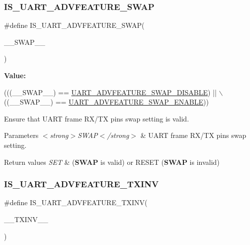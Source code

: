 \subsubsection{\texorpdfstring{I\+S\+\_\+\+U\+A\+R\+T\+\_\+\+A\+D\+V\+F\+E\+A\+T\+U\+R\+E\+\_\+\+S\+W\+AP}{IS\_UART\_ADVFEATURE\_SWAP}}
{\footnotesize\ttfamily \#define I\+S\+\_\+\+U\+A\+R\+T\+\_\+\+A\+D\+V\+F\+E\+A\+T\+U\+R\+E\+\_\+\+S\+W\+AP(\begin{DoxyParamCaption}\item[{}]{\+\_\+\+\_\+\+S\+W\+A\+P\+\_\+\+\_\+ }\end{DoxyParamCaption})}

{\bfseries Value\+:}
\begin{DoxyCode}
(((\_\_SWAP\_\_) == \hyperlink{group___u_a_r_t___rx___tx___swap_gad1217ff59732b36d4ee9b50e7ed81ec4}{UART\_ADVFEATURE\_SWAP\_DISABLE}) || \(\backslash\)
                                           ((\_\_SWAP\_\_) == 
      \hyperlink{group___u_a_r_t___rx___tx___swap_ga83138521e54eef41c75e9c37c2246eba}{UART\_ADVFEATURE\_SWAP\_ENABLE}))
\end{DoxyCode}


Ensure that U\+A\+RT frame R\+X/\+TX pins swap setting is valid. 


\begin{DoxyParams}{Parameters}
{\em $<$strong$>$\+S\+W\+A\+P$<$/strong$>$} & U\+A\+RT frame R\+X/\+TX pins swap setting. \\
\hline
\end{DoxyParams}

\begin{DoxyRetVals}{Return values}
{\em S\+ET} & ({\bfseries S\+W\+AP} is valid) or R\+E\+S\+ET ({\bfseries S\+W\+AP} is invalid) \\
\hline
\end{DoxyRetVals}
\mbox{\label{group___u_a_r_t___private___macros_ga4295a61b0afe152975609cedb9034fdc}} 
\subsubsection{\texorpdfstring{I\+S\+\_\+\+U\+A\+R\+T\+\_\+\+A\+D\+V\+F\+E\+A\+T\+U\+R\+E\+\_\+\+T\+X\+I\+NV}{IS\_UART\_ADVFEATURE\_TXINV}}
{\footnotesize\ttfamily \#define I\+S\+\_\+\+U\+A\+R\+T\+\_\+\+A\+D\+V\+F\+E\+A\+T\+U\+R\+E\+\_\+\+T\+X\+I\+NV(\begin{DoxyParamCaption}\item[{}]{\+\_\+\+\_\+\+T\+X\+I\+N\+V\+\_\+\+\_\+ }\end{DoxyParamCaption})}

